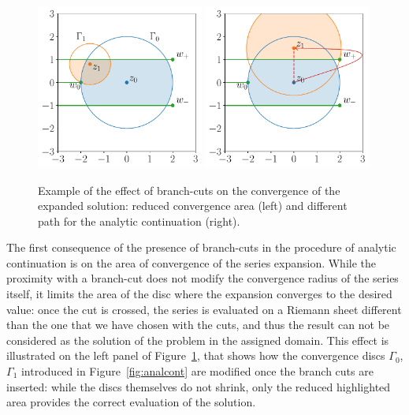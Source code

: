 \documentclass[final,1p,times]{elsarticle}
\begin{document}
\begin{figure}[t]
\includegraphics[width=0.49\textwidth]{cuts_and_convergence.pdf}
\includegraphics[width=0.49\textwidth]{cuts_and_paths.pdf}
\caption{\label{fig:cuts}
 Example of the effect of branch-cuts on the convergence of the expanded solution: reduced convergence area (left) and different path for the analytic continuation (right).}
\end{figure}

The first consequence of the presence of branch-cuts in the procedure of analytic continuation is on the area of convergence of the series expansion.
While the proximity with a branch-cut does not modify the convergence radius of the series itself, it limits the area of the disc where the expansion converges to the desired value: 
once the cut is crossed, the series is evaluated on a Riemann sheet different than the one that we have chosen with the cuts, and thus the result can not be considered as the solution of the problem in the assigned domain.
This effect is illustrated on the left panel of Figure~\ref{fig:cuts}, that shows how the convergence discs $\Gamma_0$, $\Gamma_1$ introduced in Figure~\ref{fig:analcont} are modified once the branch cuts are inserted: while the discs themselves do not shrink, only the reduced highlighted area provides the correct evaluation of the solution.
\end{document}
